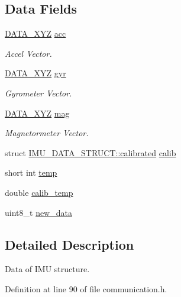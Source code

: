 \subsection*{Data Fields}
\begin{DoxyCompactItemize}
\item 
\hyperlink{structDATA__XYZ}{D\-A\-T\-A\-\_\-\-X\-Y\-Z} \hyperlink{structIMU__DATA__STRUCT_a448f284bf44eb503affda586ad5fa9d2}{acc}
\begin{DoxyCompactList}\small\item\em Accel Vector. \end{DoxyCompactList}\item 
\hyperlink{structDATA__XYZ}{D\-A\-T\-A\-\_\-\-X\-Y\-Z} \hyperlink{structIMU__DATA__STRUCT_a0c1ac26626e4434a2ee124a1928a23a1}{gyr}
\begin{DoxyCompactList}\small\item\em Gyrometer Vector. \end{DoxyCompactList}\item 
\hyperlink{structDATA__XYZ}{D\-A\-T\-A\-\_\-\-X\-Y\-Z} \hyperlink{structIMU__DATA__STRUCT_a40c7df8b6d49297aa52873cfd9b60daa}{mag}
\begin{DoxyCompactList}\small\item\em Magnetormeter Vector. \end{DoxyCompactList}\item 
struct \hyperlink{structIMU__DATA__STRUCT_1_1calibrated}{I\-M\-U\-\_\-\-D\-A\-T\-A\-\_\-\-S\-T\-R\-U\-C\-T\-::calibrated} \hyperlink{structIMU__DATA__STRUCT_aeffe3c3c5a7191a5cef16e7aab6c3795}{calib}
\item 
short int \hyperlink{structIMU__DATA__STRUCT_a81e1dbf765c1d947ca6076aa1bbc73e7}{temp}
\item 
double \hyperlink{structIMU__DATA__STRUCT_a3553fcee6beba17fe0c7711ac0483875}{calib\-\_\-temp}
\item 
uint8\-\_\-t \hyperlink{structIMU__DATA__STRUCT_a99924252176326418863e511d4fa437b}{new\-\_\-data}
\end{DoxyCompactItemize}


\subsection{Detailed Description}
Data of I\-M\-U structure. 

Definition at line 90 of file communication.\-h.



